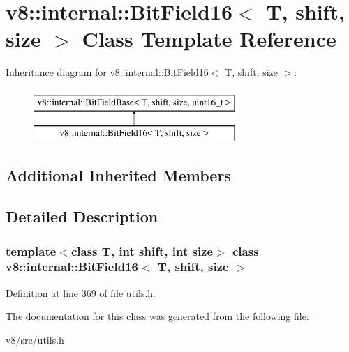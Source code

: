 \hypertarget{classv8_1_1internal_1_1BitField16}{}\section{v8\+:\+:internal\+:\+:Bit\+Field16$<$ T, shift, size $>$ Class Template Reference}
\label{classv8_1_1internal_1_1BitField16}
Inheritance diagram for v8\+:\+:internal\+:\+:Bit\+Field16$<$ T, shift, size $>$\+:\begin{figure}[H]
\begin{center}
\leavevmode
\includegraphics[height=2.000000cm]{classv8_1_1internal_1_1BitField16}
\end{center}
\end{figure}
\subsection*{Additional Inherited Members}


\subsection{Detailed Description}
\subsubsection*{template$<$class T, int shift, int size$>$\newline
class v8\+::internal\+::\+Bit\+Field16$<$ T, shift, size $>$}



Definition at line 369 of file utils.\+h.



The documentation for this class was generated from the following file\+:\begin{DoxyCompactItemize}
\item 
v8/src/utils.\+h\end{DoxyCompactItemize}
